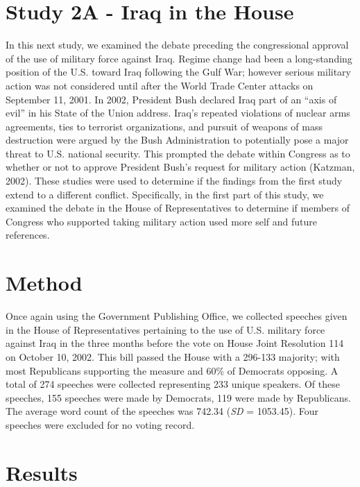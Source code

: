 \documentclass[
  english,
  ,man,floatsintext]{apa6}
\begin{document}
\hypertarget{study-2a---iraq-in-the-house}{%
\section{Study 2A - Iraq in the House}\label{study-2a---iraq-in-the-house}}

In this next study, we examined the debate preceding the congressional approval of the use of military force against Iraq. Regime change had been a long-standing position of the U.S. toward Iraq following the Gulf War; however serious military action was not considered until after the World Trade Center attacks on September 11, 2001. In 2002, President Bush declared Iraq part of an \enquote{axis of evil} in his State of the Union address. Iraq's repeated violations of nuclear arms agreements, ties to terrorist organizations, and pursuit of weapons of mass destruction were argued by the Bush Administration to potentially pose a major threat to U.S. national security. This prompted the debate within Congress as to whether or not to approve President Bush's request for military action (Katzman, 2002). These studies were used to determine if the findings from the first study extend to a different conflict. Specifically, in the first part of this study, we examined the debate in the House of Representatives to determine if members of Congress who supported taking military action used more self and future references.

\hypertarget{method-2}{%
\section{Method}\label{method-2}}

Once again using the Government Publishing Office, we collected speeches given in the House of Representatives pertaining to the use of U.S. military force against Iraq in the three months before the vote on House Joint Resolution 114 on October 10, 2002. This bill passed the House with a 296-133 majority; with most Republicans supporting the measure and 60\% of Democrats opposing. A total of 274 speeches were collected representing 233 unique speakers. Of these speeches, 155 speeches were made by Democrats, 119 were made by Republicans. The average word count of the speeches was 742.34 (\emph{SD} = 1053.45). Four speeches were excluded for no voting record.

\hypertarget{results-2}{%
\section{Results}\label{results-2}}
\end{document}
